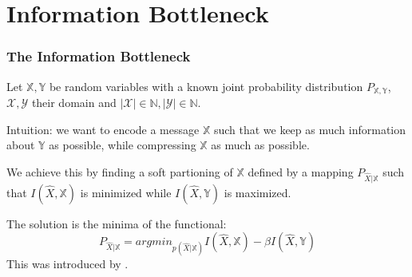 \section[IB]{Information Bottleneck} 



\begin{frame}
    \frametitle{The Information Bottleneck}
    Let $\mathbb{X}, \mathbb{Y}$ be random variables with a known joint probability distribution $P_{\mathbb{X}, \mathbb{Y}}$, $\mathcal{X}, \mathcal{Y}$ their domain and  $|\mathcal{X}| \in \mathbb{N}, |\mathcal{Y}| \in \mathbb{N}$. \newline

    Intuition: we want to encode a message $\mathbb{X}$ such that we keep as much information about $\mathbb{Y}$ as possible, while compressing $\mathbb{X}$ as much as possible. \newline

    We achieve this by finding a soft partioning of $\mathbb{X}$ defined by a mapping $P_{\hat{X}|\mathbb{X}}$ such that $I(\hat{X},\mathbb{X})$ is minimized while $I(\hat{X},\mathbb{Y})$ is maximized. \newline

    The solution is the minima of the functional:
    \begin{equation}
        P_{\hat{X}|\mathbb{X}} = argmin_{p(\hat{X}|\mathbb{X})} 
        I(\hat{X},\mathbb{X}) - \beta I(\hat{X}, \mathbb{Y})
    \end{equation}
    This was introduced by \cite{tishby_information_2000}.


    
\end{frame}


